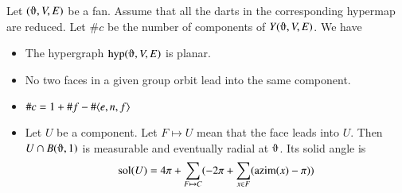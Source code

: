 \begin{lemma}  Let $(\orgn,V,E)$ be a fan.  Assume
that all the darts in the corresponding hypermap are reduced.   
Let $\#c$ be the number
of components of $Y(\orgn,V,E)$.  We have
    \begin{itemize}
    \item The hypergraph $\op{hyp}(\orgn,V,E)$ is planar.
    \item No two faces in a given group orbit lead
    into the same component.
    \item $\#c = 1 + \#f - \#\langle e,n,f\rangle$
    \item Let $U$ be a component. Let $F\mapsto U$ mean
    that the face leads into $U$.  Then $U \cap B(\orgn,1)$ 
       is measurable and eventually radial at $\orgn$.  Its solid angle is
        $${\operatorname{sol}}(U) = 4\pi + \sum_{F\mapsto C}(-2\pi + \sum_{x\in F}
        ({\operatorname{azim}}(x)-\pi))$$
    \end{itemize}
\end{lemma}

